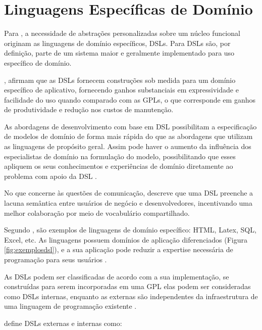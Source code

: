 \section{Linguagens Específicas de Domínio}
\label{sec:dsl}

Para , a necessidade de abstrações personalizadas sobre um núcleo funcional originam as linguagens de domínio específicos, \gls{DSL}s. Para  \gls{DSL}s são, por definição, parte de um sistema maior e geralmente implementado para uso específico de domínio.

, afirmam que as \gls{DSL}s fornecem construções sob medida para um domínio específico de aplicativo, fornecendo ganhos substanciais em expressividade e facilidade do uso quando comparado com as \gls{GPL}s, o que corresponde em ganhos de produtividade e redução nos custos de manutenção.

As abordagens de desenvolvimento com base em \gls{DSL} possibilitam a especificação de modelos de domínio de forma mais rápida do que as abordagens que utilizam as linguagens de propósito geral. Assim pode haver o aumento da influência dos especialistas de domínio na formulação do modelo, possibilitando que esses apliquem os seus conhecimentos e experiências de domínio diretamente ao problema com apoio da DSL \cite{athos2019}.

No que concerne às questões de comunicação,  descreve que uma \gls{DSL} preenche a lacuna semântica entre usuários de negócio e desenvolvedores, incentivando uma melhor colaboração por meio de vocabulário compartilhado.  

Segundo , são exemplos de linguagens de domínio específico: HTML, Latex, SQL, Excel, etc. As linguagens possuem domínios de aplicação diferenciados (Figura \ref{fig:exemplosdsl}), e a sua aplicação pode reduzir a expertise necessária de programação para seus usuários .




As \gls{DSL}s podem ser classificadas de acordo com a sua implementação, se construídas para serem incorporadas em uma \gls{GPL} elas podem ser consideradas como \gls{DSL}s internas, enquanto as externas são independentes da infraestrutura de uma linguagem de programação existente \cite{dslengineering}.

 define \gls{DSL}s externas e internas como:

